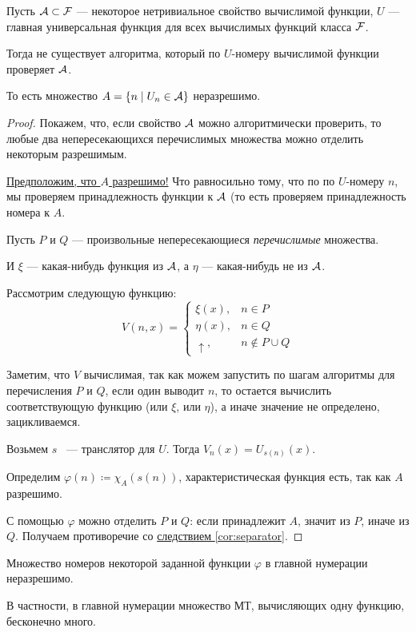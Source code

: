 \begin{thm}
	Пусть $ \mathcal{A} \subset \mathcal{F}$ --- некоторое нетривиальное свойство вычислимой функции, 
	$ U$ --- главная универсальная функция для всех вычислимых функций класса $ \mathcal{F}$.

	Тогда не существует алгоритма, который по  $ U$-номеру вычислимой функции проверяет $ \mathcal{A}$. 

	То есть множество $ A = \{n \mid U_n \in \mathcal{A}\}$ неразрешимо.
\end{thm}
\begin{proof}
    Покажем, что, если свойство $ \mathcal{A}$ можно алгоритмически проверить, то любые два непересекающихся перечислимых множества можно отделить некоторым разрешимым.
    
    \underline{Предположим, что $A$ разрешимо!} Что равносильно тому, что по по $U$-номеру $n$, мы проверяем принадлежность функции к $\mathcal{A}$ (то есть проверяем принадлежность номера к $A$.

	Пусть $ P$ и $ Q$ --- произвольные непересекающиеся \textit{перечислимые} множества. 

	И $ \xi$ --- какая-нибудь функция из $ \mathcal{A}$, а $ \eta$ --- какая-нибудь не из $ \mathcal{A}$.

	Рассмотрим следующую функцию:
	\[
		V(n, x) = 
		\begin{cases}
			\xi(x), & n \in P \\
			\eta(x), & n \in Q\\
			\uparrow, & n \notin P \cup Q
		\end{cases}
	\] 

	Заметим, что $ V$ вычислимая, так как можем запустить по шагам алгоритмы для перечисления $ P$ и $ Q$, если один выводит $n$, то остается вычислить соответствующую функцию (или $\xi$, или $\eta$), а иначе значение не определено, зацикливаемся.
	
	Возьмем $s$ ~--- транслятор для $U$. Тогда $V_n(x) = U_{s(n)}(x)$. 

	Определим $\varphi(n) \coloneqq \chi_A(s(n))$, характеристическая функция есть, так как $A$ разрешимо.

	С помощью $\varphi$ можно отделить $P$ и $Q$: если принадлежит $A$, значит из $P$, иначе из $Q$. Получаем противоречие со \hyperref[cor:separator]{следствием \ref{cor:separator}}.
\end{proof}

\begin{cor}\label{cor:4}
    Множество номеров некоторой заданной функции $ \varphi $ в главной нумерации неразрешимо.

	В частности, в главной нумерации множество МТ, вычисляющих одну функцию, бесконечно много.
\end{cor}

